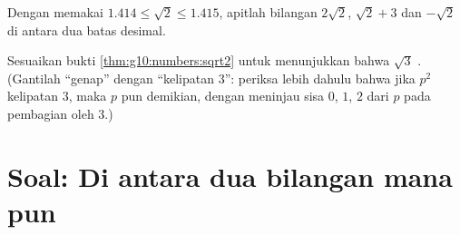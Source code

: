 \begin{exercise}[$\star\star$]\label{exo:g10:numbers:9}
Dengan memakai $1.414 \leq \sqrt 2 \leq 1.415$, apitlah bilangan $2\sqrt2$,
$\sqrt2 + 3$ dan $-\sqrt2$ di antara dua batas desimal.
\end{exercise}

\begin{exercise}[$\star\star\star$]\label{exo:g10:numbers:10}
Sesuaikan bukti \cref{thm:g10:numbers:sqrt2} untuk menunjukkan bahwa $\sqrt 3$
. (Gantilah ``genap'' dengan ``kelipatan $3$'': periksa lebih dahulu
bahwa jika $p^2$ kelipatan $3$, maka $p$ pun demikian, dengan meninjau sisa
$0$, $1$, $2$ dari $p$ pada pembagian oleh $3$.)
\end{exercise}

\section{Soal: Di antara dua bilangan mana pun}

